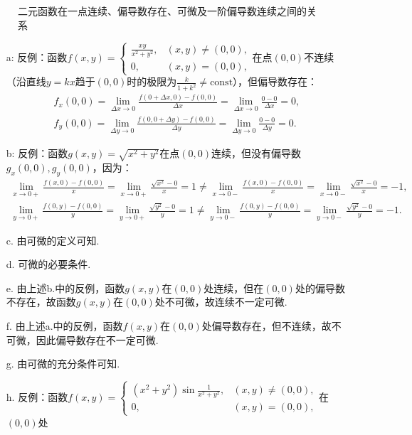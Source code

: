 \documentclass[12pt,UTF8]{ctexart}
\begin{document}
\begin{enumerate}
\begin{figure}[H]
\begin{center}
\end{center}
\caption{二元函数在一点连续、偏导数存在、可微及一阶偏导数连续之间的关系}
\end{figure}
\begin{enumerate}
\item[a:]反例：函数$f(x,y)=\begin{cases}
\frac{xy}{x^2+y^2},&(x,y)\neq(0,0),\\
0,&(x,y)=(0,0),
\end{cases}$在点$(0,0)$不连续（沿直线$y=kx$趋于$(0,0)$时的极限为$\frac k{1+k^2}\neq\text{const}$），但偏导数存在：
\[\begin{aligned}
f_x(0,0)=\lim\limits_{\Delta x\rightarrow0}\frac{f(0+\Delta x,0)-f(0,0)}{\Delta x}=\lim\limits_{\Delta x\rightarrow0}\frac{0-0}{\Delta x}=0,\\
f_y(0,0)=\lim\limits_{\Delta y\rightarrow0}\frac{f(0,0+\Delta y)-f(0,0)}{\Delta y}=\lim\limits_{\Delta y\rightarrow0}\frac{0-0}{\Delta y}=0.
\end{aligned}\]
\item[b:]反例：函数$g(x,y)=\sqrt{x^2+y^2}$在点$(0,0)$连续，但没有偏导数$g_x(0,0),g_y(0,0)$，因为：
\[\begin{aligned}
\lim\limits_{x\rightarrow0+}\frac{f(x,0)-f(0,0)}{x}=\lim\limits_{x\rightarrow0+}\frac{\sqrt{x^2}-0}{x}=1\neq\lim\limits_{x\rightarrow0-}\frac{f(x,0)-f(0,0)}{x}=\lim\limits_{x\rightarrow0-}\frac{\sqrt{x^2}-0}{x}=-1,\\
\lim\limits_{y\rightarrow0+}\frac{f(0,y)-f(0,0)}{y}=\lim\limits_{y\rightarrow0+}\frac{\sqrt{y^2}-0}{y}=1\neq\lim\limits_{y\rightarrow0-}\frac{f(0,y)-f(0,0)}{y}=\lim\limits_{y\rightarrow0-}\frac{\sqrt{y^2}-0}{y}=-1.
\end{aligned}\]
\item[c.]由可微的定义可知.
\item[d.]可微的必要条件.
\item[e.]由上述b.中的反例，函数$g(x,y)$在$(0,0)$处连续，但在$(0,0)$处的偏导数不存在，故函数$g(x,y)$在$(0,0)$处不可微，故连续不一定可微.
\item[f.]由上述a.中的反例，函数$f(x,y)$在$(0,0)$处偏导数存在，但不连续，故不可微，因此偏导数存在不一定可微.
\item[g.]由可微的充分条件可知.
\item[h.]反例：函数$f(x,y)=\begin{cases}
(x^2+y^2)\sin\frac1{x^2+y^2},&(x,y)\neq(0,0),\\
0,&(x,y)=(0,0),
\end{cases}$在$(0,0)$处
\[\begin{aligned}

\end{aligned}\]
\end{enumerate}
\end{enumerate}
\end{document}
